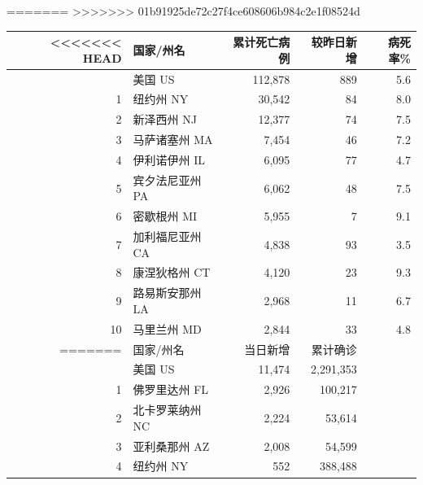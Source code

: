 \documentclass[
]{article}
\begin{document}
\begin{table}[H]
\begin{minipage}{.4\linewidth}
\begin{table}[H]
\end{table} \end{minipage}%
    \begin{minipage}{.7\linewidth}
     \caption{美国新增死亡前十位州}
     \vspace{0.5\baselineskip}
=======
>>>>>>> 01b91925de72c27f4ce608606b984c2e1f08524d
      \centering
    \captionsetup{justification=centering} \begin{table}[H]
\centering
\begin{tabular}{rlrrr}
\toprule
<<<<<<< HEAD
  & 国家/州名 & 累计死亡病例 & 较昨日新增 & 病死率\%\\
\midrule
\rowcolor{gray!6}   & 美国 US & 112,878 & 889 & 5.6\\
1 & 纽约州 NY & 30,542 & 84 & 8.0\\
\rowcolor{gray!6}  2 & 新泽西州 NJ & 12,377 & 74 & 7.5\\
3 & 马萨诸塞州 MA & 7,454 & 46 & 7.2\\
\rowcolor{gray!6}  4 & 伊利诺伊州 IL & 6,095 & 77 & 4.7\\
5 & 宾夕法尼亚州 PA & 6,062 & 48 & 7.5\\
\rowcolor{gray!6}  6 & 密歇根州 MI & 5,955 & 7 & 9.1\\
7 & 加利福尼亚州 CA & 4,838 & 93 & 3.5\\
\rowcolor{gray!6}  8 & 康涅狄格州 CT & 4,120 & 23 & 9.3\\
9 & 路易斯安那州 LA & 2,968 & 11 & 6.7\\
\rowcolor{gray!6}  10 & 马里兰州 MD & 2,844 & 33 & 4.8\\
=======
  & 国家/州名 & 当日新增 & 累计确诊\\
\midrule
\rowcolor{gray!6}   & 美国 US & 11,474 & 2,291,353\\
1 & 佛罗里达州 FL & 2,926 & 100,217\\
\rowcolor{gray!6}  2 & 北卡罗莱纳州 NC & 2,224 & 53,614\\
3 & 亚利桑那州 AZ & 2,008 & 54,599\\
\rowcolor{gray!6}  4 & 纽约州 NY & 552 & 388,488\\

\end{tabular}
\end{table}
\end{minipage}
\end{table}
\end{document}
